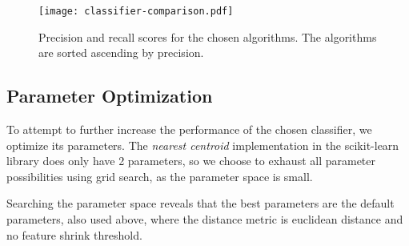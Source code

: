 
\begin{figure}[tbp]
\centering
\texttt{[image: classifier-comparison.pdf]}
\caption{Precision and recall scores for the chosen algorithms. The algorithms are sorted ascending by precision.}\label{fig:classifier_comparison}
\end{figure}


\subsection{Parameter Optimization}
To attempt to further increase the performance of the chosen classifier, we optimize its parameters. The \emph{nearest centroid} implementation in the scikit-learn library does only have 2 parameters, so we choose to exhaust all parameter possibilities using grid search, as the parameter space is small.

Searching the parameter space reveals that the best parameters are the default parameters, also used above, where the distance metric is euclidean distance and no feature shrink threshold.

